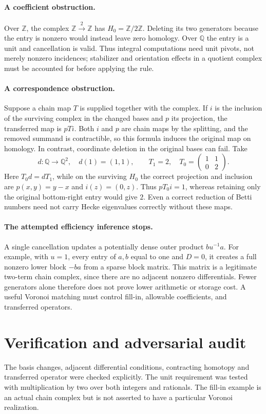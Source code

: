 \documentclass[11pt]{article}
\begin{document}
\paragraph{A coefficient obstruction.}
Over $\mathbb Z$, the complex $\mathbb Z\xrightarrow{2}\mathbb Z$ has $H_0=\mathbb Z/2\mathbb Z$. Deleting its two generators because the entry is nonzero would instead leave zero homology. Over $\mathbb Q$ the entry is a unit and cancellation is valid. Thus integral computations need unit pivots, not merely nonzero incidences; stabilizer and orientation effects in a quotient complex must be accounted for before applying the rule.

\paragraph{A correspondence obstruction.}
Suppose a chain map $T$ is supplied together with the complex. If $i$ is the inclusion of the surviving complex in the changed bases and $p$ its projection, the transferred map is $pTi$. Both $i$ and $p$ are chain maps by the splitting, and the removed summand is contractible, so this formula induces the original map on homology. In contrast, coordinate deletion in the original bases can fail. Take
\[
 d:\mathbb Q\longrightarrow\mathbb Q^2,\quad d(1)=(1,1),\qquad
 T_1=2,\quad T_0=\begin{pmatrix}1&1\\0&2\end{pmatrix}.
\]
Here $T_0d=dT_1$, while on the surviving $H_0$ the correct projection and inclusion are $p(x,y)=y-x$ and $i(z)=(0,z)$. Thus $pT_0i=1$, whereas retaining only the original bottom-right entry would give $2$. Even a correct reduction of Betti numbers need not carry Hecke eigenvalues correctly without these maps.

\paragraph{The attempted efficiency inference stops.}
A single cancellation updates a potentially dense outer product $bu^{-1}a$. For example, with $u=1$, every entry of $a,b$ equal to one and $D=0$, it creates a full nonzero lower block $-ba$ from a sparse block matrix. This matrix is a legitimate two-term chain complex, since there are no adjacent nonzero differentials. Fewer generators alone therefore does not prove lower arithmetic or storage cost. A useful Voronoi matching must control fill-in, allowable coefficients, and transferred operators.
\section{Verification and adversarial audit}
The basis changes, adjacent differential conditions, contracting homotopy and transferred operator were checked explicitly. The unit requirement was tested with multiplication by two over both integers and rationals. The fill-in example is an actual chain complex but is not asserted to have a particular Voronoi realization.
\end{document}
